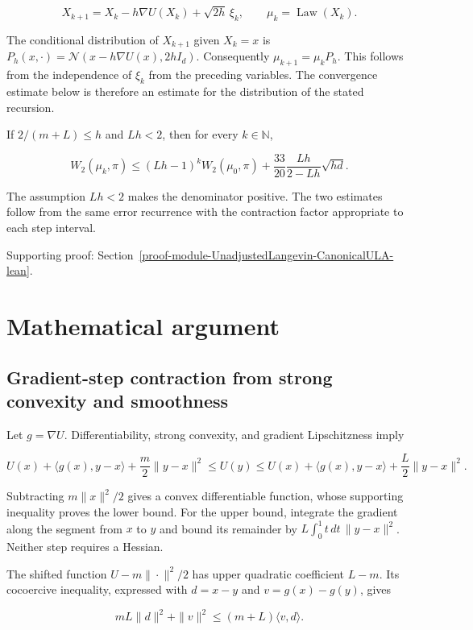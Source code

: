 \documentclass[11pt,a4paper]{report}
\begin{document}
\[X_{k+1}=X_k-h\nabla U(X_k)+\sqrt{2h}\,\xi_k,\qquad\mu_k=\operatorname{Law}(X_k).\]


The conditional distribution of \(X_{k+1}\) given \(X_k=x\) is \(P_h(x,\cdot)=\mathcal N(x-h\nabla U(x),2hI_d)\). Consequently \(\mu_{k+1}=\mu_kP_h\). This follows from the independence of \(\xi_k\) from the preceding variables. The convergence estimate below is therefore an estimate for the distribution of the stated recursion.




If \(2/(m+L)\le h\) and \(Lh<2\), then for every \(k\in\mathbb N\),

\[W_2(\mu_k,\pi)\le(Lh-1)^kW_2(\mu_0,\pi)+\frac{33}{20}\frac{Lh}{2-Lh}\sqrt{hd}.\]

The assumption \(Lh<2\) makes the denominator positive. The two estimates follow from the same error recurrence with the contraction factor appropriate to each step interval.


{\small\color{gray}Supporting proof: Section~\ref{proof-module-UnadjustedLangevin-CanonicalULA-lean}.\par}
\chapter{Mathematical argument}
\section{\texorpdfstring{Gradient-step contraction from strong convexity and smoothness}{Gradient-step contraction from strong convexity and smoothness}}



Let \(g=\nabla U\). Differentiability, strong convexity, and gradient Lipschitzness imply

\[U(x)+\langle g(x),y-x\rangle+\frac m2\|y-x\|^2
\le U(y)\le U(x)+\langle g(x),y-x\rangle+\frac L2\|y-x\|^2.\]

Subtracting \(m\|x\|^2/2\) gives a convex differentiable function, whose supporting inequality proves the lower bound. For the upper bound, integrate the gradient along the segment from \(x\) to \(y\) and bound its remainder by \(L\int_0^1t\,dt\,\|y-x\|^2\). Neither step requires a Hessian.



The shifted function \(U-m\|\cdot\|^2/2\) has upper quadratic coefficient \(L-m\). Its cocoercive inequality, expressed with \(d=x-y\) and \(v=g(x)-g(y)\), gives

\[mL\|d\|^2+\|v\|^2\le(m+L)\langle v,d\rangle.\]
\end{document}
